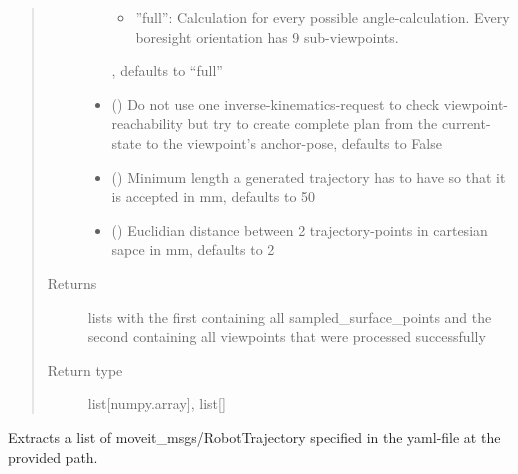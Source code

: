 \documentclass[letterpaper,10pt,english]{sphinxmanual}
\begin{document}
\begin{fulllineitems}
\begin{fulllineitems}
\begin{quote}
\begin{description}
\begin{itemize}
\begin{itemize}
\item {} 
”full”: Calculation for every possible angle-calculation. Every boresight orientation has 9 sub-viewpoints.

\end{itemize}

, defaults to “full”


\item {} 
 (\sphinxstyleliteralemphasis{, }) \textendash{} Do not use one inverse-kinematics-request to check viewpoint-reachability but try to create complete plan from the current-state to the viewpoint’s anchor-pose, defaults to False

\item {} 
 (\sphinxstyleliteralemphasis{, }) \textendash{} Minimum length a generated trajectory has to have so that it is accepted in mm, defaults to 50

\item {} 
 (\sphinxstyleliteralemphasis{, }) \textendash{} Euclidian distance between 2 trajectory-points in cartesian sapce in mm, defaults to 2

\end{itemize}

\item[{Returns}]  lists with the first containing all sampled\_surface\_points and the second containing all viewpoints that were processed successfully

\item[{Return type}] \leavevmode
list{[}numpy.array{]}, list{[}{\hyperref[\detokenize{module_view:agiprobot_measurement.viewpoint.ViewPoint}]{}}{]}

\end{description}\end{quote}

\end{fulllineitems}


\begin{fulllineitems}
\label{\detokenize{module_trajectory_manager:agiprobot_measurement.trajectory_manager.TrajectoryManager.load_execution_plan}}
Extracts a list of moveit\_msgs/RobotTrajectory specified in the yaml-file at the provided path.


\end{fulllineitems}
\end{fulllineitems}
\end{document}
